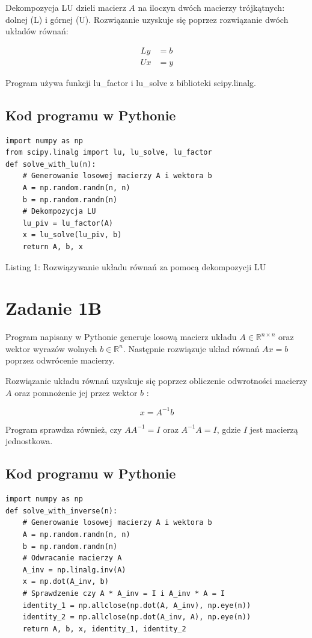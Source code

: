 \documentclass[10pt]{article}
\begin{document}
Dekompozycja LU dzieli macierz $A$ na iloczyn dwóch macierzy trójkątnych: dolnej (L) i górnej (U). Rozwiązanie uzyskuje się poprzez rozwiązanie dwóch układów równań:

$$
\begin{aligned}
L y & =b \\
U x & =y
\end{aligned}
$$

Program używa funkcji lu\_factor i lu\_solve z biblioteki scipy.linalg.

\subsection*{Kod programu w Pythonie}
\begin{verbatim}
import numpy as np
from scipy.linalg import lu, lu_solve, lu_factor
def solve_with_lu(n):
    # Generowanie losowej macierzy A i wektora b
    A = np.random.randn(n, n)
    b = np.random.randn(n)
    # Dekompozycja LU
    lu_piv = lu_factor(A)
    x = lu_solve(lu_piv, b)
    return A, b, x
\end{verbatim}

Listing 1: Rozwiązywanie układu równań za pomocą dekompozycji LU

\section*{Zadanie 1B}
Program napisany w Pythonie generuje losową macierz układu $A \in \mathbb{R}^{n \times n}$ oraz wektor wyrazów wolnych $b \in \mathbb{R}^{n}$. Następnie rozwiązuje układ równań $A x=b$ poprzez odwrócenie macierzy.

Rozwiązanie układu równań uzyskuje się poprzez obliczenie odwrotności macierzy $A$ oraz pomnożenie jej przez wektor $b$ :

$$
x=A^{-1} b
$$

Program sprawdza również, czy $A A^{-1}=I$ oraz $A^{-1} A=I$, gdzie $I$ jest macierzą jednostkowa.

\subsection*{Kod programu w Pythonie}
\begin{verbatim}
import numpy as np
def solve_with_inverse(n):
    # Generowanie losowej macierzy A i wektora b
    A = np.random.randn(n, n)
    b = np.random.randn(n)
    # Odwracanie macierzy A
    A_inv = np.linalg.inv(A)
    x = np.dot(A_inv, b)
    # Sprawdzenie czy A * A_inv = I i A_inv * A = I
    identity_1 = np.allclose(np.dot(A, A_inv), np.eye(n))
    identity_2 = np.allclose(np.dot(A_inv, A), np.eye(n))
    return A, b, x, identity_1, identity_2
\end{verbatim}
\end{document}
